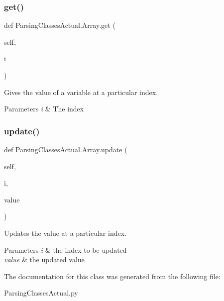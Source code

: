 \subsubsection{\texorpdfstring{get()}{get()}}
{\footnotesize\ttfamily def Parsing\+Classes\+Actual.\+Array.\+get (\begin{DoxyParamCaption}\item[{}]{self,  }\item[{}]{i }\end{DoxyParamCaption})}



Gives the value of a variable at a particular index. 


\begin{DoxyParams}{Parameters}
{\em i} & The index \\
\hline
\end{DoxyParams}
\mbox{\label{class_parsing_classes_actual_1_1_array_a2a61097f1b529f1bdc8dcc4639e44414}} 
\subsubsection{\texorpdfstring{update()}{update()}}
{\footnotesize\ttfamily def Parsing\+Classes\+Actual.\+Array.\+update (\begin{DoxyParamCaption}\item[{}]{self,  }\item[{}]{i,  }\item[{}]{value }\end{DoxyParamCaption})}



Updates the value at a particular index. 


\begin{DoxyParams}{Parameters}
{\em i} & the index to be updated \\
\hline
{\em value} & the updated value \\
\hline
\end{DoxyParams}


The documentation for this class was generated from the following file\+:\begin{DoxyCompactItemize}
\item 
Parsing\+Classes\+Actual.\+py\end{DoxyCompactItemize}
